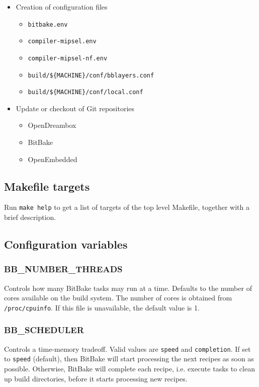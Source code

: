 \documentclass[a4paper]{article}
\newcommand{\shell}[1]{\texttt{\small #1}}
\begin{document}
  \begin{itemize}
    \item Creation of configuration files
      \begin{itemize}
        \item \shell{bitbake.env}
        \item \shell{compiler-mipsel.env}
        \item \shell{compiler-mipsel-nf.env}
        \item \shell{build/\$\{MACHINE\}/conf/bblayers.conf}
        \item \shell{build/\$\{MACHINE\}/conf/local.conf}
      \end{itemize}
    \item Update or checkout of Git repositories
      \begin{itemize}
        \item OpenDreambox
        \item BitBake
        \item OpenEmbedded
      \end{itemize}
  \end{itemize}

  \subsection{Makefile targets}
    Run \shell{make help} to get a list of targets of the top level Makefile, together with a brief description.

  \subsection{Configuration variables}
    \subsubsection{BB\_NUMBER\_THREADS}
      Controls how many BitBake tasks may run at a time. Defaults to the
      number of cores available on the build system. The number of cores is
      obtained from \shell{/proc/cpuinfo}. If this file is unavailable, the
      default value is 1.

    \subsubsection{BB\_SCHEDULER}
      Controls a time-memory tradeoff. Valid values are \shell{speed} and
      \shell{completion}. If set to \shell{speed} (default), then BitBake
      will start processing the next recipes as soon as possible. Otherwise,
      BitBake will complete each recipe, i.e. execute tasks to clean up
      build directories, before it starts processing new recipes.
\end{document}
